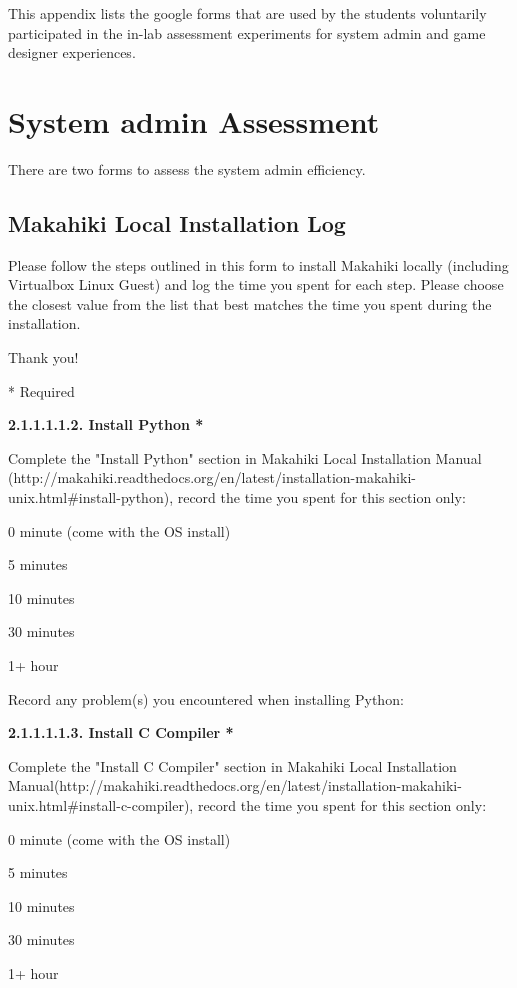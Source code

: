 This appendix lists the google forms that are used by the students voluntarily participated in the in-lab assessment experiments for system admin and game designer experiences.

\section{System admin Assessment}
There are two forms to assess the system admin efficiency.

\subsection{Makahiki Local Installation Log}

\setlength{\parindent}{0pt}
\setlength{\parskip}{3mm}

Please follow the steps outlined in this form to install Makahiki locally (including Virtualbox Linux Guest) and log the time you spent for each step.
Please choose the closest value from the list that best matches the time you spent during the installation.

Thank you!

* Required

{\bf 2.1.1.1.1.2. Install Python *}

Complete the "Install Python" section in Makahiki Local Installation Manual (http://makahiki.readthedocs.org/en/latest/installation-makahiki-unix.html\#install-python), record the time you spent for this section only:

\begin{compactitem}
\item 0 minute (come with the OS install)
\item 5 minutes
\item  10 minutes
\item  30 minutes
\item  1+ hour
\end{compactitem}


Record any problem(s) you encountered when installing Python:

{\bf 2.1.1.1.1.3. Install C Compiler *}

Complete the "Install C Compiler" section in Makahiki Local Installation Manual(http://makahiki.readthedocs.org/en/latest/installation-makahiki-unix.html\#install-c-compiler), record the time you spent for this section only:

\begin{compactitem}
\item 0 minute (come with the OS install)
\item 5 minutes
\item  10 minutes
\item  30 minutes
\item  1+ hour
\end{compactitem}

